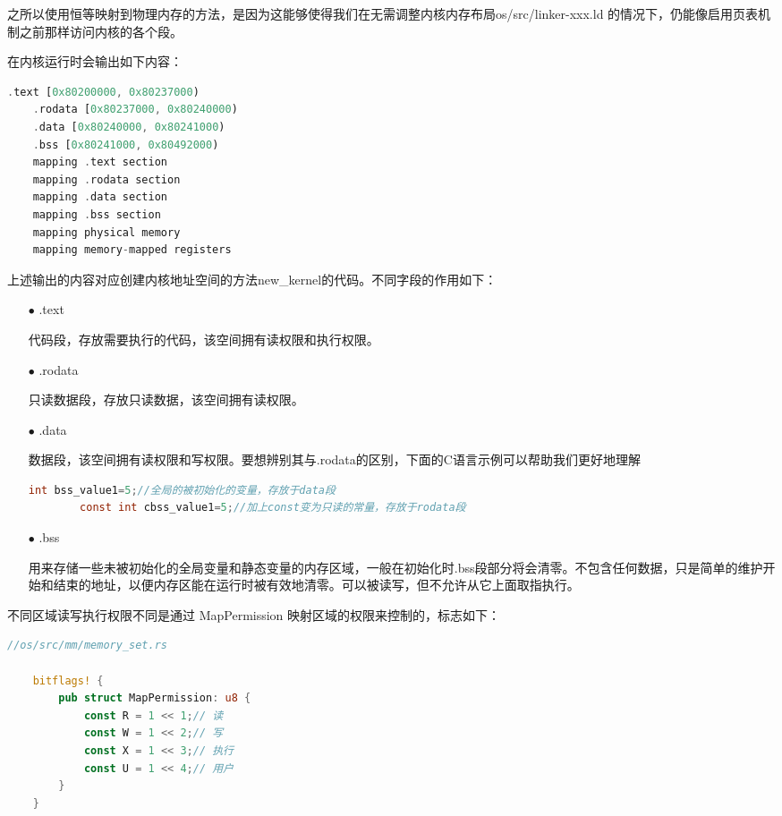 之所以使用恒等映射到物理内存的方法，是因为这能够使得我们在无需调整内核内存布局os/src/linker-xxx.ld 的情况下，仍能像启用页表机制之前那样访问内核的各个段。

在内核运行时会输出如下内容：

\begin{lstlisting}[language={Rust}]
	.text [0x80200000, 0x80237000)
	.rodata [0x80237000, 0x80240000)
	.data [0x80240000, 0x80241000)
	.bss [0x80241000, 0x80492000)
	mapping .text section
	mapping .rodata section
	mapping .data section
	mapping .bss section
	mapping physical memory
	mapping memory-mapped registers
\end{lstlisting}

上述输出的内容对应创建内核地址空间的方法new\_kernel的代码。不同字段的作用如下：

\begin{itemize}
	\item[$\bullet$] .text
	
	代码段，存放需要执行的代码，该空间拥有读权限和执行权限。
	
	\item[$\bullet$] .rodata
	
	只读数据段，存放只读数据，该空间拥有读权限。
	
	\item[$\bullet$] .data
	
	数据段，该空间拥有读权限和写权限。要想辨别其与.rodata的区别，下面的C语言示例可以帮助我们更好地理解
	
	\begin{lstlisting}[language={C}]
		int bss_value1=5;//全局的被初始化的变量，存放于data段
		const int cbss_value1=5;//加上const变为只读的常量，存放于rodata段
	\end{lstlisting}
	
	\item[$\bullet$] .bss
	
	⽤来存储一些未被初始化的全局变量和静态变量的内存区域，一般在初始化时.bss段部分将会清零。不包含任何数据，只是简单的维护开始和结束的地址，以便内存区能在运行时被有效地清零。可以被读写，但不允许从它上面取指执行。
	
\end{itemize}


\hspace*{\fill}

不同区域读写执行权限不同是通过 MapPermission 映射区域的权限来控制的，标志如下：
\begin{lstlisting}[language={Rust}]
	//os/src/mm/memory_set.rs
	
	bitflags! {
		pub struct MapPermission: u8 {
			const R = 1 << 1;// 读
			const W = 1 << 2;// 写
			const X = 1 << 3;// 执⾏
			const U = 1 << 4;// 用户
		}
	}
\end{lstlisting}

